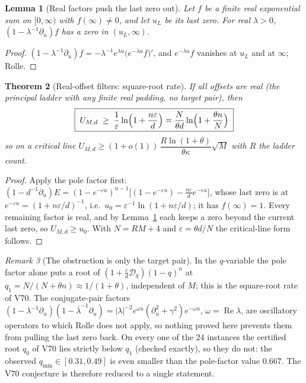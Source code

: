 \documentclass[11pt]{article}
\newtheorem{theorem}{Theorem}[section]
\newtheorem{lemma}[theorem]{Lemma}
\theoremstyle{definition}
\theoremstyle{remark}
\newtheorem{remark}[theorem]{Remark}
\begin{document}
\begin{lemma}[Real factors push the last zero out]
\label{lem:f2v71-rolle}
Let \(f\) be a finite real exponential sum on \([0,\infty)\) with
\(f(\infty)\ne0\), and let \(u_L\) be its last zero.  For real
\(\lambda>0\), \((1-\lambda^{-1}\partial_u)f\) has a zero in
\((u_L,\infty)\).
\end{lemma}

\begin{proof}
\((1-\lambda^{-1}\partial_u)f=-\lambda^{-1}e^{\lambda u}\bigl(e^{-\lambda u}f\bigr)'\),
and \(e^{-\lambda u}f\) vanishes at \(u_L\) and at \(\infty\); Rolle.
\end{proof}

\begin{theorem}[Real-offset filters: square-root rate]
\label{thm:f2v71-real}
If all offsets are real (the principal ladder with any finite real
padding, no target pair), then
\begin{equation}
 \boxed{\;U_{M,d}\;\ge\;\frac1\varepsilon\ln\Bigl(1+\frac{n\varepsilon}d\Bigr)
 =\frac N{\theta d}\ln\Bigl(1+\frac{\theta n}N\Bigr)\;}
 \label{eq:f2v71-real}
\end{equation}
so on a critical line \(U_{M,d}\ge(1+o(1))\,\dfrac{R\ln(1+\theta)}{\theta\kappa}\sqrt M\)
with \(R\) the ladder count.
\end{theorem}

\begin{proof}
Apply the pole factor first:
\((1-d^{-1}\partial_u)E=(1-e^{-\varepsilon u})^{n-1}\bigl[(1-e^{-\varepsilon u})-\tfrac{n\varepsilon}de^{-\varepsilon u}\bigr]\),
whose last zero is at \(e^{-\varepsilon u}=(1+n\varepsilon/d)^{-1}\), i.e.\
\(u_0=\varepsilon^{-1}\ln(1+n\varepsilon/d)\); it has \(f(\infty)=1\).  Every
remaining factor is real, and by Lemma~\ref{lem:f2v71-rolle} each keeps a
zero beyond the current last zero, so \(U_{M,d}\ge u_0\).  With
\(N=RM+4\) and \(\varepsilon=\theta d/N\) the critical-line form follows.
\end{proof}

\begin{remark}[The obstruction is only the target pair]
\label{rem:f2v71-pairs}
In the \(q\)-variable the pole factor alone puts a root of
\((1+\tfrac\varepsilon d\mathcal D_q)(1-q)^n\) at
\(q_1=N/(N+\theta n)\approx1/(1+\theta)\), independent of \(M\); this is
the square-root rate of V70.  The conjugate-pair factors
\((1-\lambda^{-1}\partial_u)(1-\bar\lambda^{-1}\partial_u)
=|\lambda|^{-2}e^{\omega u}(\partial_u^2+\gamma^2)e^{-\omega u}\),
\(\omega=\operatorname{Re}\lambda\), are oscillatory operators to which
Rolle does not apply, so nothing proved here prevents them from pulling
the last zero back.  On every one of the \(24\) instances the certified
root \(q_0\) of V70 lies strictly below \(q_1\) (checked exactly), so
they do not: the observed \(q_{\min}\in[0.31,0.49]\) is even smaller than
the pole-factor value \(0.667\).  The V70 conjecture is therefore reduced
to a single statement.
\end{remark}
\end{document}

